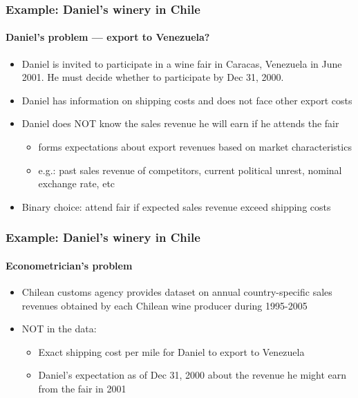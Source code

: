 
\begin{frame}
\frametitle{Example: Daniel's winery in Chile} \framesubtitle{Daniel's
problem --- export to Venezuela?}

\begin{itemize}
\item Daniel is invited to participate in a wine fair in Caracas, Venezuela
in June 2001. He must decide whether to participate by Dec 31, 2000.

\item Daniel has information on shipping costs and does not face other
export costs

\item Daniel does NOT know the sales revenue he will earn if he attends the
fair

\begin{itemize}
\item forms expectations about export revenues based on market
characteristics 

\item e.g.: past sales revenue of competitors, current political unrest,
nominal exchange rate, etc
\end{itemize}

\item Binary choice: attend fair if expected sales revenue exceed shipping
costs
\end{itemize}
\end{frame}


\begin{frame}
\frametitle{Example: Daniel's winery in Chile} %
\framesubtitle{Econometrician's problem}

\begin{itemize}
\item Chilean customs agency provides dataset on annual country-specific
sales revenues obtained by each Chilean wine producer during 1995-2005

\item NOT in the data: 

\begin{itemize}
\item Exact shipping cost per mile for Daniel to export to Venezuela 

\item Daniel's expectation as of Dec 31, 2000 about the revenue he might
earn from the fair in 2001 
\end{itemize}
\end{itemize}
\end{frame}


